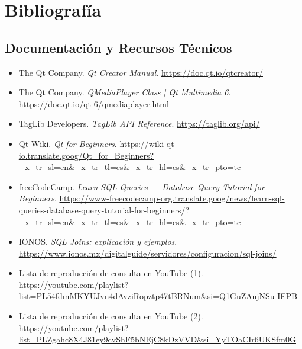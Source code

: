 \documentclass[11pt,a4paper]{article}
\begin{document}
    \section{Bibliografía}
    
    \subsection{Documentación y Recursos Técnicos}
    \begin{itemize}
        \item The Qt Company. \textit{Qt Creator Manual}. \url{https://doc.qt.io/qtcreator/}
        \item The Qt Company. \textit{QMediaPlayer Class | Qt Multimedia 6}. \url{https://doc.qt.io/qt-6/qmediaplayer.html}
        \item TagLib Developers. \textit{TagLib API Reference}. \url{https://taglib.org/api/}
        \item Qt Wiki. \textit{Qt for Beginners}. \url{https://wiki-qt-io.translate.goog/Qt_for_Beginners?_x_tr_sl=en&_x_tr_tl=es&_x_tr_hl=es&_x_tr_pto=tc}
        \item freeCodeCamp. \textit{Learn SQL Queries --- Database Query Tutorial for Beginners}. \url{https://www-freecodecamp-org.translate.goog/news/learn-sql-queries-database-query-tutorial-for-beginners/?_x_tr_sl=en&_x_tr_tl=es&_x_tr_hl=es&_x_tr_pto=tc}
        \item IONOS. \textit{SQL Joins: explicación y ejemplos}. \url{https://www.ionos.mx/digitalguide/servidores/configuracion/sql-joins/}
        \item Lista de reproducción de consulta en YouTube (1). \url{https://youtube.com/playlist?list=PL54fdmMKYUJvn4dAvziRopztp47tBRNum&si=Q1GuZAujNSu-IFPB}
        \item Lista de reproducción de consulta en YouTube (2). \url{https://youtube.com/playlist?list=PLZgahc8X4J81ey9cvShF5bNEjC8kDzVVD&si=YyTOaCIr6UKSfm0G}
    \end{itemize}
    
\end{document}
